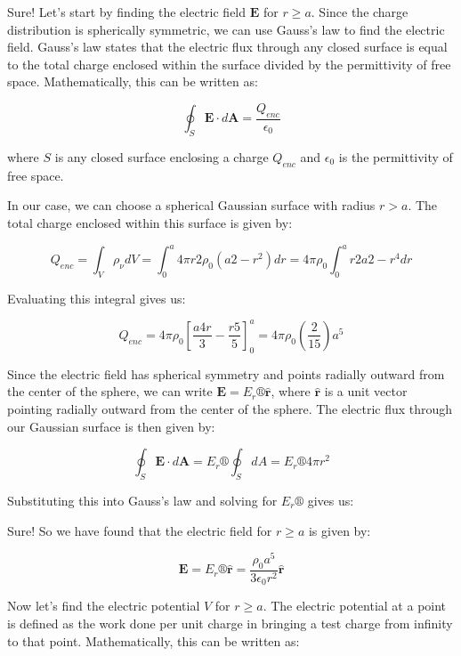 






Sure! Let’s start by finding the electric field $\mathbf{E}$ for $r \geq a$. Since the charge distribution is spherically symmetric, we can use Gauss’s law to find the electric field. Gauss’s law states that the electric flux through any closed surface is equal to the total charge enclosed within the surface divided by the permittivity of free space. Mathematically, this can be written as:

$$ \oint_S \mathbf{E} \cdot d\mathbf{A} = \frac{Q_{enc}}{\epsilon_0} $$

where $S$ is any closed surface enclosing a charge $Q_{enc}$ and $\epsilon_0$ is the permittivity of free space.

In our case, we can choose a spherical Gaussian surface with radius $r>a$. The total charge enclosed within this surface is given by:

$$ Q_{enc} = \int_V \rho_\nu dV = \int_0^a 4\pi r2\rho_0\left(a2-r^2\right) dr = 4\pi\rho_0\int_0^a r2a2 - r^4 dr $$

Evaluating this integral gives us:

$$ Q_{enc} = 4\pi\rho_0\left[\frac{a4r}{3}-\frac{r5}{5}\right]_0^a = 4\pi\rho_0\left(\frac{2}{15}\right)a^5 $$

Since the electric field has spherical symmetry and points radially outward from the center of the sphere, we can write $\mathbf{E}=E_r®\hat{\mathbf{r}}$, where $\hat{\mathbf{r}}$ is a unit vector pointing radially outward from the center of the sphere. The electric flux through our Gaussian surface is then given by:

$$ \oint_S \mathbf{E} \cdot d\mathbf{A} = E_r® \oint_S dA = E_r® 4\pi r^2 $$

Substituting this into Gauss’s law and solving for $E_r®$ gives us:

Sure! So we have found that the electric field for $r \geq a$ is given by:

$$ \mathbf{E} = E_r®\hat{\mathbf{r}} = \frac{\rho_0 a^5}{3\epsilon_0 r^2}\hat{\mathbf{r}} $$

Now let’s find the electric potential $V$ for $r \geq a$. The electric potential at a point is defined as the work done per unit charge in bringing a test charge from infinity to that point. Mathematically, this can be written as:

